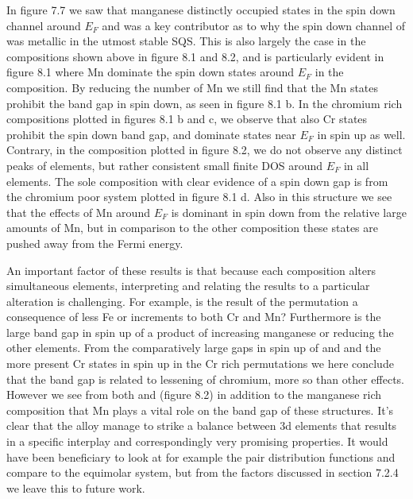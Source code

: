 In figure 7.7 we saw that manganese distinctly occupied states in the spin down channel around $E_F$ and was a key contributor as to why the spin down channel of  was metallic in the utmost stable SQS. This is also largely the case in the compositions shown above in figure 8.1 and 8.2, and is particularly evident in figure 8.1 where Mn dominate the spin down states around $E_F$ in the  composition. By reducing the number of Mn we still find that the Mn states prohibit the band gap in spin down, as seen in figure 8.1 b. In the chromium rich compositions plotted in figures 8.1 b and c, we observe that also Cr states prohibit the spin down band gap, and dominate states near $E_F$ in spin up as well. Contrary, in the  composition plotted in figure 8.2, we do not observe any distinct peaks of elements, but rather consistent small finite DOS around $E_F$ in all elements.  The sole composition with clear evidence of a spin down gap is from the chromium poor system plotted in figure 8.1 d. Also in this structure we see that the effects of Mn around $E_F$ is dominant in spin down from the relative large amounts of Mn, but in comparison to the other composition these states are pushed away from the Fermi energy.

An important factor of these results is that because each composition alters simultaneous elements, interpreting and relating the results to a particular alteration is challenging. For example, is the result of the  permutation a consequence of less Fe or increments to both Cr and Mn? Furthermore is the large band gap in spin up of  a product of increasing manganese or reducing the other elements. From the comparatively large gaps in spin up of  and  and the more present Cr states in spin up in the Cr rich permutations we here conclude that the band gap is related to lessening of chromium, more so than other effects. However we see from both  and  (figure 8.2) in addition to the manganese rich composition that Mn plays a vital role on the band gap of these structures. It's clear that the  alloy manage to strike a balance between 3d elements that results in a specific interplay and correspondingly very promising properties. It would have been beneficiary to look at for example the pair distribution functions and compare to the equimolar system, but from the factors discussed in section 7.2.4 we leave this to future work. 

